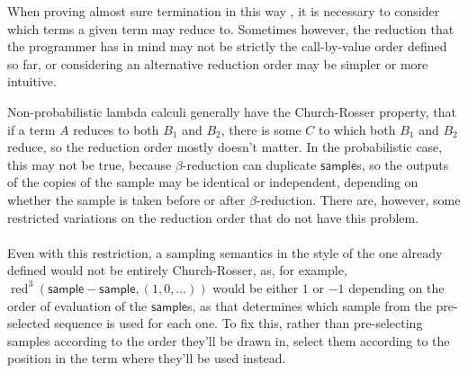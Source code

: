 \documentclass{article}
\newcommand{\tsample}{\mathsf{sample}}
\DeclareMathOperator{\red}{red}
\theoremstyle{definition}
\theoremstyle{lemma}
\theoremstyle{remark}
\begin{document}
When proving almost sure termination in this way , it is necessary to consider which terms a given term may reduce to. Sometimes however, the reduction that the programmer has in mind may not be strictly the call-by-value order defined so far, or considering an alternative reduction order may be simpler or more intuitive.

Non-probabilistic lambda calculi generally have the Church-Rosser property, that if a term $A$ reduces to both $B_1$ and $B_2$, there is some $C$ 
to which both $B_1$ and $B_2$ reduce,
so the reduction order mostly doesn't matter. 
In the probabilistic case, this may not be true, because $\beta$-reduction can duplicate $\tsample$s, so the outputs of the copies of the sample may be identical or independent, depending on whether the sample is taken before or after $\beta$-reduction. 
There are, however, some restricted variations on the reduction order that do not have this problem.

\paragraph{}
Even with this restriction, a sampling semantics in the style of the one already defined would not be entirely Church-Rosser, as, for example, $\red^3(\tsample - \tsample, (1,0,\dots))$ would be either $1$ or $-1$ depending on the order of evaluation of the $\tsample$s, as that determines which sample from the pre-selected sequence is used for each one. To fix this, rather than pre-selecting samples according to the order they'll be drawn in, select them according to the position in the term where they'll be used instead.
\end{document}
